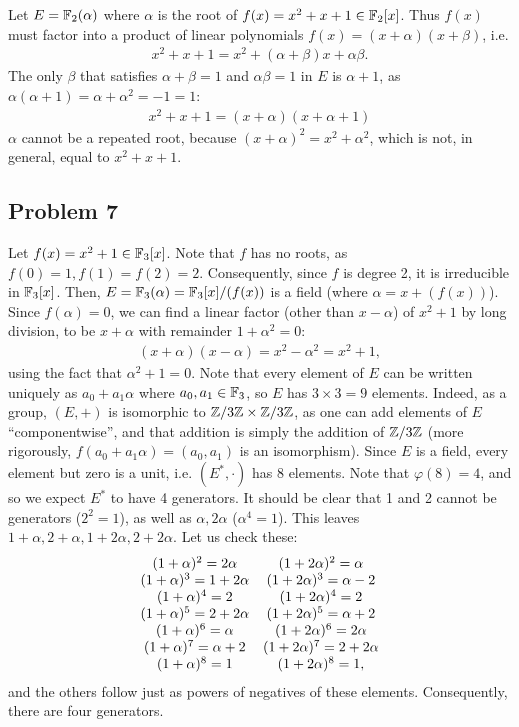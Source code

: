 \documentclass{../../mathnotes}
\begin{document}
Let $E=\mathbb{F}_2(\alpha)$ where $\alpha$ is the root of $f(x)=x^2+x+1\in \mathbb{F}_2[x]$. Thus $f(x)$ must factor into
a product of linear polynomials $f(x)=(x+\alpha)(x+\beta)$, i.e.
\begin{align*}
    x^2+x+1=x^2+(\alpha+\beta)x+\alpha\beta.
\end{align*}
The only $\beta$ that satisfies $\alpha+\beta=1$ and $\alpha\beta=1$ in $E$ is $\alpha+1$, as
$\alpha(\alpha+1)=\alpha+\alpha^2=-1=1$:
\begin{align*}
    x^2+x+1=(x+\alpha)(x+\alpha+1)
\end{align*}
$\alpha$ cannot be a repeated root, because $(x+\alpha)^2=x^2+\alpha^2$, which is not, in general, equal to $x^2+x+1$.

\subsection*{Problem 7}

Let $f(x)=x^2+1\in\mathbb{F}_3[x]$. Note that $f$ has no roots, as $f(0)=1, f(1)=f(2)=2$. Consequently, since $f$ is
degree 2, it is irreducible in $\mathbb{F}_3[x]$. Then, $E=\mathbb{F}_3(\alpha)=\mathbb{F}_3[x]/(f(x))$ is a field (where
$\alpha=x+(f(x))$). Since $f(\alpha)=0$, we can find a linear factor (other than $x-\alpha$) of $x^2+1$ by long division, to be
$x+\alpha$ with remainder $1+\alpha^2=0$:
\begin{align*}
    (x+\alpha)(x-\alpha)=x^2-\alpha^2=x^2+1,
\end{align*}
using the fact that $\alpha^2+1=0$. Note that every element of $E$ can be written uniquely as $a_0+a_1\alpha$
where $a_0,a_1\in\mathbb{F}_3$, so $E$ has $3\times3=9$ elements. Indeed, as a group, $(E,+)$ is isomorphic
to $\mathbb{Z}/3\mathbb{Z}\times \mathbb{Z}/3\mathbb{Z}$, as one can add elements of $E$ ``componentwise'', and that addition is simply
the addition of $\mathbb{Z}/3\mathbb{Z}$ (more rigorously, $f(a_0+a_1\alpha)=(a_0,a_1)$ is an isomorphism). Since $E$ is a
field, every element but zero is a unit, i.e. $(E^*,\cdot)$ has
8 elements. Note that $\varphi(8)=4$, and so we expect $E^*$ to have 4 generators. It should be clear that
1 and 2 cannot be generators ($2^2=1$), as well as $\alpha,2\alpha$ ($\alpha^4=1$). This leaves
$1+\alpha,2+\alpha,1+2\alpha,2+2\alpha$. Let us check these:
\begin{align*}
    \begin{array}[]{cc}
        (1+\alpha)^2=2\alpha & (1+2\alpha)^2=\alpha\\
        (1+\alpha)^3=1+2\alpha & (1+2\alpha)^3=\alpha-2\\
        (1+\alpha)^4=2 & (1+2\alpha)^4=2\\
        (1+\alpha)^5=2+2\alpha & (1+2\alpha)^5=\alpha+2\\
        (1+\alpha)^6=\alpha & (1+2\alpha)^6=2\alpha\\
        (1+\alpha)^7=\alpha+2 & (1+2\alpha)^7=2+2\alpha\\
        (1+\alpha)^8=1 & (1+2\alpha)^8=1,
    \end{array}
\end{align*}
and the others follow just as powers of negatives of these elements. Consequently, there are four
generators.
\end{document}
